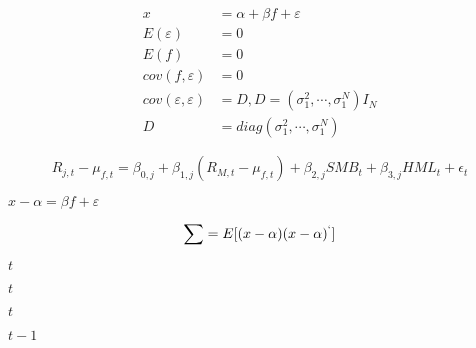 \documentclass[10pt]{book}
\begin{document}
\begin{mdSnippets}
\begin{mdDisplaySnippet}[241cc0862a03c3f0cb7c5c6ad8ef3f5f]%
\[%
\begin{aligned}
x &= \alpha+\beta f+\varepsilon  \\ 
E(\varepsilon) &= 0\\ 
E(f)&= 0\\ 
 cov(f,\varepsilon)&=0 \\ 
 cov(\varepsilon,\varepsilon)&= D,D=(\sigma_1^2,\cdots ,\sigma_1^N)I_N\\ 
 D&= diag(\sigma_1^2,\cdots ,\sigma_1^N)
\end{aligned}
\]%
\end{mdDisplaySnippet}%
\begin{mdDisplaySnippet}[c669600b5fa80da9a676e1d353ddcfec]%
\[%
R_{j,t}-\mu_{f,t} = \beta_{0,j}+\beta_{1,j}(R_{M,t}-\mu_{f,t})+\beta_{2,j}SMB_t+\beta_{3,j}HML_t+\epsilon_t
\]%
\end{mdDisplaySnippet}%
\begin{mdInlineSnippet}%
$x-\alpha=\beta f+\varepsilon$\end{mdInlineSnippet}%
\begin{mdDisplaySnippet}[89044974233b5f858d3acdfb634a2052]%
\[%
\sum=E[(x-\alpha)(x-\alpha)^`]
\]%
\end{mdDisplaySnippet}%
\begin{mdInlineSnippet}[e358efa489f58062f10dd7316b65649e]%
$t$\end{mdInlineSnippet}%
\begin{mdInlineSnippet}[e358efa489f58062f10dd7316b65649e]%
$t$\end{mdInlineSnippet}%
\begin{mdInlineSnippet}[e358efa489f58062f10dd7316b65649e]%
$t$\end{mdInlineSnippet}%
\begin{mdInlineSnippet}[f3e90ce87a25538f5a4be79a0a7c0fa5]%
$t-1$\end{mdInlineSnippet}%

\end{mdSnippets}
\end{document}
